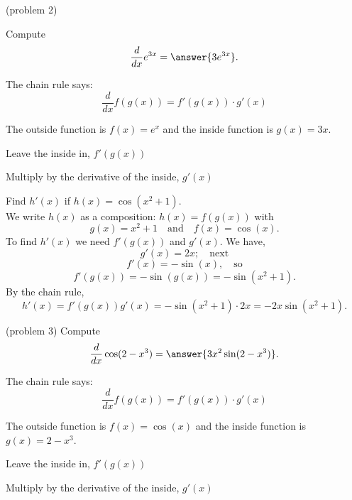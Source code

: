 \documentclass[handout]{ximera}
\begin{document}
\begin{problem}(problem 2)
  
Compute
  \[
  \frac{d}{dx} e^{3x} = \answer{3e^{3x}}.
  \]
  
    \begin{hint}
      The chain rule says:
      \[
      \frac{d}{dx} f(g(x)) = f'(g(x))\cdot g'(x)
      \]
    \end{hint}
    \begin{hint}
      The outside function is $f(x) = e^x$ and the inside
      function is $g(x) = 3x$.
    \end{hint}
    \begin{hint}
		  Leave the inside in, $f'(g(x))$
		\end{hint}
		\begin{hint}
		  Multiply by the derivative of the inside, $g'(x)$
		\end{hint}
    
\end{problem}


\begin{example}[example 3]
Find $h'(x)$ if $h(x) = \cos(x^2 + 1)$.\\
We write $h(x)$ as a composition: $h(x)=f(g(x))$ with
\[
g(x) = x^2 + 1  \quad \text{and} \quad  f(x) = \cos(x).
\]
To find $h'(x)$ we need $f'(g(x))$ and $g'(x)$. We have,
\[
g'(x) = 2x; \quad \text{next}
\]
\[
f'(x) = -\sin(x), \quad \text{so}
\]
\[
f'(g(x))= -\sin(g(x)) = -\sin(x^2 + 1).
\]
By the chain rule,
\[
h'(x) = f'(g(x))g'(x) = -\sin(x^2 + 1) \cdot 2x = -2x\sin(x^2 + 1).
\]

\end{example}


\begin{center}
\begin{foldable}
\end{foldable}
\end{center}

\begin{problem}(problem 3)
  Compute
  \[
  \frac{d}{dx} \cos(2-x^3) = \answer{3x^2\sin(2-x^3)}.
  \]
  
    \begin{hint}
      The chain rule says:
      \[
      \frac{d}{dx} f(g(x)) = f'(g(x))\cdot g'(x)
      \]
    \end{hint}
    \begin{hint}
      The outside function is $f(x) = \cos(x)$ and the inside
      function is $g(x) = 2-x^3$.
    \end{hint}
    \begin{hint}
		  Leave the inside in, $f'(g(x))$
		\end{hint}
		\begin{hint}
		  Multiply by the derivative of the inside, $g'(x)$
		\end{hint}
    
\end{problem}
\end{document}

